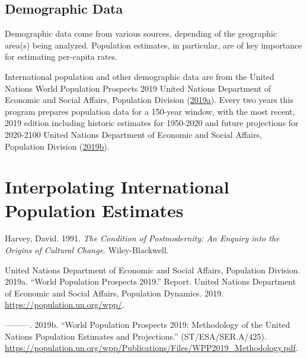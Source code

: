 \documentclass[
  12pt,
]{book}
\newlength{\cslhangindent}
\newenvironment{cslreferences}%
  {\setlength{\parindent}{0pt}%
  \everypar{\setlength{\hangindent}{\cslhangindent}}\ignorespaces}%
  {\par}
\begin{document}
\hypertarget{demographic-data}{%
\subsection{Demographic Data}\label{demographic-data}}

Demographic data come from various sources, depending of the geographic area(s) being analyzed.
Population estimates, in particular, are of key importance for estimating per-capita rates.

International population and other demographic data are from the United Nations World Population Prospects 2019 United Nations Department of Economic and Social Affairs, Population Division (\protect\hyperlink{ref-UnitedNationsDepartmentofEconomicandSocialAffairsPopulationDivisionWorldPopulationProspects2019c}{2019}\protect\hyperlink{ref-UnitedNationsDepartmentofEconomicandSocialAffairsPopulationDivisionWorldPopulationProspects2019c}{a}). Every two years this program prepares population data for a 150-year window, with the most recent, 2019 edition including historic estimates for 1950-2020 and future projections for 2020-2100 United Nations Department of Economic and Social Affairs, Population Division (\protect\hyperlink{ref-UnitedNationsDepartmentofEconomicandSocialAffairsPopulationDivisionWorldPopulationProspects2019a}{2019}\protect\hyperlink{ref-UnitedNationsDepartmentofEconomicandSocialAffairsPopulationDivisionWorldPopulationProspects2019a}{b}).

\hypertarget{interpolating-international-population-estimates}{%
\section{Interpolating International Population Estimates}\label{interpolating-international-population-estimates}}

\hypertarget{refs}{}
\begin{cslreferences}
\leavevmode\hypertarget{ref-HarveyConditionPostmodernityEnquiry1991}{}%
Harvey, David. 1991. \emph{The Condition of Postmodernity: An Enquiry into the Origins of Cultural Change}. Wiley-Blackwell.

\leavevmode\hypertarget{ref-UnitedNationsDepartmentofEconomicandSocialAffairsPopulationDivisionWorldPopulationProspects2019c}{}%
United Nations Department of Economic and Social Affairs, Population Division. 2019a. ``World Population Prospects 2019.'' Report. United Nations Department of Economic and Social Affairs, Population Dynamics. 2019. \url{https://population.un.org/wpp/}.

\leavevmode\hypertarget{ref-UnitedNationsDepartmentofEconomicandSocialAffairsPopulationDivisionWorldPopulationProspects2019a}{}%
---------. 2019b. ``World Population Prospects 2019: Methodology of the United Nations Population Estimates and Projections.'' (ST/ESA/SER.A/425). \url{https://population.un.org/wpp/Publications/Files/WPP2019_Methodology.pdf}.
\end{cslreferences}
\end{document}
